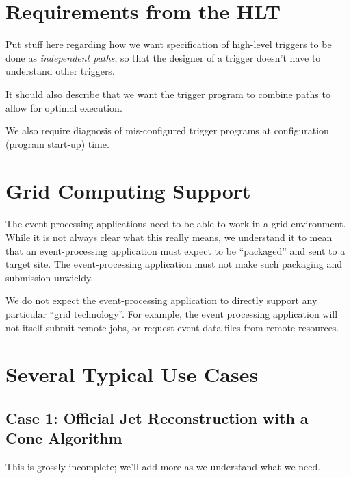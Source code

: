 \documentclass[draftmode]{memarticle}
\begin{document}
\section{Requirements from the HLT}

\begin{fixme}
Put stuff here regarding how we want specification of high-level triggers
to be done as \emph{independent paths}, so that the designer of a trigger
doesn't have to understand other triggers.

It should also describe that we want the trigger program
to combine paths to allow for optimal execution.

We also require diagnosis of mis-configured trigger programs
at configuration (program start-up) time.
\end{fixme}

\section{Grid Computing Support}

The event-processing applications
need to be able to work in a grid environment.
While it is not always clear what this really means,
we understand it to mean
that an event-processing application
must expect to be ``packaged'' and sent to a target site.
The event-processing application must not make such packaging and submission unwieldy.

We do not expect the event-processing application
to directly support any particular ``grid technology''.
For example,
the event processing application will not itself submit remote jobs,
or request event-data files from remote resources.

\section{Several Typical Use Cases}

\subsection{Case 1: Official Jet Reconstruction with a Cone Algorithm}

\begin{fixme}
This is grossly incomplete; we'll add more as we understand what we need.
\end{fixme}
\end{document}
